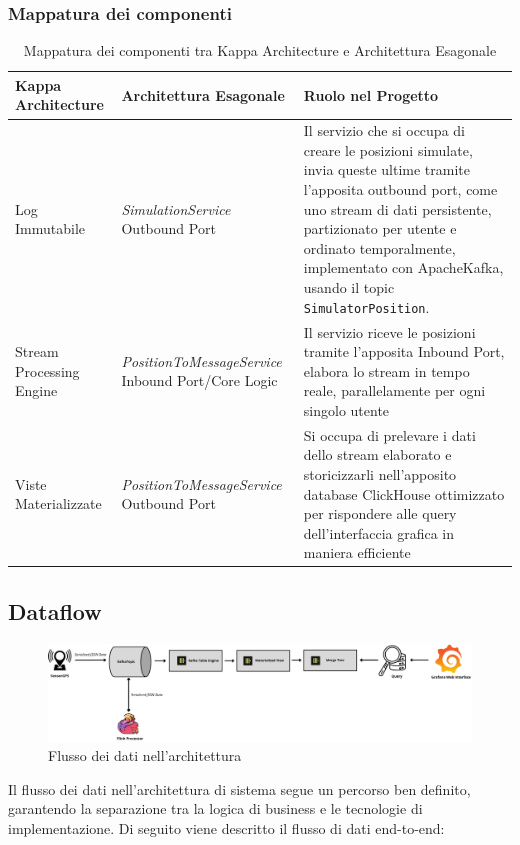 \documentclass[10pt]{article}
\begin{document}
\subsubsection{Mappatura dei componenti}

\begin{table}[H]
\centering
\renewcommand{\arraystretch}{1.5}
\begin{tabular}{|>{\centering\arraybackslash}m{4cm}|>{\centering\arraybackslash}m{4cm}|>{\raggedright\arraybackslash}m{6cm}|}
\hline
\rowcolor{gray!25}
\textbf{Kappa Architecture} & \textbf{Architettura Esagonale} & \textbf{Ruolo nel Progetto} \\
\hline
Log Immutabile & \textit{SimulationService} Outbound Port & Il servizio che si occupa di creare le posizioni simulate, invia queste ultime tramite l'apposita outbound port, come uno stream di dati persistente, partizionato per utente e ordinato temporalmente, implementato con ApacheKafka, usando il topic \texttt{SimulatorPosition}. \\
\hline
Stream Processing Engine & \textit{PositionToMessageService} Inbound Port/Core Logic & Il servizio riceve le posizioni tramite l'apposita Inbound Port, elabora lo stream in tempo reale, parallelamente per ogni singolo utente\\
\hline
Viste Materializzate & \textit{PositionToMessageService} Outbound Port & Si occupa di prelevare i dati dello stream elaborato e storicizzarli nell'apposito database ClickHouse ottimizzato per rispondere alle query dell'interfaccia grafica in maniera efficiente\\
\hline
\end{tabular}
\caption{Mappatura dei componenti tra Kappa Architecture e Architettura Esagonale}
\label{tab:mappatura_componenti}
\end{table}



    \subsection{Dataflow}

    \begin{figure}[H]
        \centering
        \includegraphics[width=\textwidth]{Dataflow.pdf}
        \caption{Flusso dei dati nell'architettura}
    \end{figure}
    Il flusso dei dati nell'architettura di sistema segue un percorso ben definito, garantendo la separazione tra la logica di business e le tecnologie di implementazione. Di seguito viene descritto il flusso di dati end-to-end:
    
\end{document}
